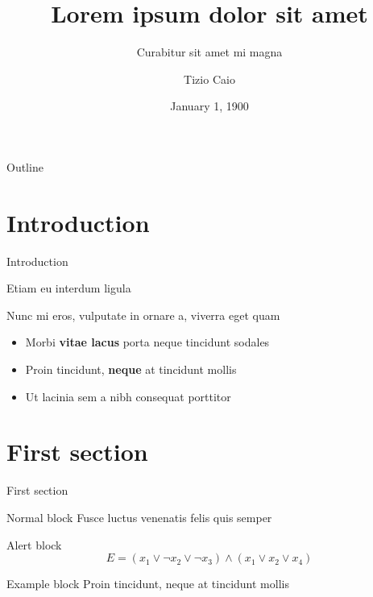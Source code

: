 \documentclass[11pt]{beamer}
\title{Lorem ipsum dolor sit amet}
\subtitle{Curabitur sit amet mi magna}
\author{Tizio Caio}
\date{January 1, 1900}
\begin{document}
    \begin{frame}[plain]
        \maketitle
    \end{frame}

    \begin{frame}{Outline}
        \tableofcontents
    \end{frame}
    
    
    \section{Introduction}
    
    \begin{frame}{Introduction}
        
        Etiam eu interdum ligula
        
        Nunc mi eros, vulputate in ornare a, viverra eget quam \vspace{.5em}
        
        \begin{itemize}
            \item Morbi \textbf{vitae lacus} porta neque tincidunt sodales \vspace{.5em}
            \item Proin tincidunt, \textbf{neque} at tincidunt mollis \vspace{.5em}
            \item Ut \alert{lacinia sem a nibh} consequat porttitor
        \end{itemize}
    \end{frame}
    
    
    \section{First section}
    
    \begin{frame}{First section}
        \begin{block}{Normal block}
            Fusce luctus venenatis felis quis semper
        \end{block}
        
        \begin{alertblock}{Alert block}
            $$ E = (x_1 \vee \neg x_2 \vee \neg x_3) \wedge (x_1 \vee x_2 \vee x_4) $$
        \end{alertblock}
        
        \begin{exampleblock}{Example block}
            Proin tincidunt, neque at tincidunt mollis
        \end{exampleblock}
    \end{frame}
    
\end{document}
